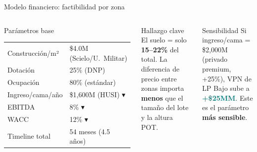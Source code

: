 \documentclass[aspectratio=169, 11pt]{beamer}
\newcommand{\highlight}[1]{\textcolor{teal}{\textbf{#1}}}
\begin{document}
\begin{frame}{Modelo financiero: factibilidad por zona}
\begin{columns}[T]
\begin{block}{\small Parámetros base}
\scriptsize
\begin{tabular}{@{}ll@{}}
Construcción/m² & \$4.0M {\tiny(Scielo/U.\ Militar)} \\
Dotación & 25\% {\tiny(DNP)} \\
Ocupación & 80\% {\tiny(estándar)} \\
Ingreso/cama/año & \$1,600M {\tiny(HUSI)} {\color{coral}$\blacktriangledown$} \\
EBITDA & 8\% {\color{coral}$\blacktriangledown$} \\
WACC & 12\% {\color{coral}$\blacktriangledown$} \\
Timeline total & 54 meses (4.5 años) \\
\end{tabular}
\end{block}

\vspace{4pt}
\begin{exampleblock}{\small Hallazgo clave}
\footnotesize El suelo = solo \textbf{15--22\%} del total. La diferencia de precio entre zonas importa \textbf{menos} que el tamaño del lote y la altura POT.
\end{exampleblock}

\vspace{3pt}
\begin{alertblock}{\small Sensibilidad}
\footnotesize Si ingreso/cama = \$2,000M (privado premium, +25\%), VPN de LP Bajo sube a \highlight{+\$25MM}. Este es el parámetro \textbf{más sensible}.
\end{alertblock}
\end{columns}
\end{frame}
\end{document}

